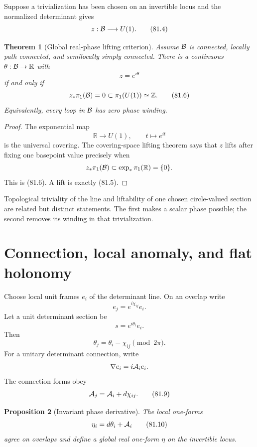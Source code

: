 \documentclass[11pt]{article}
\newtheorem{theorem}{Theorem}[section]
\newtheorem{proposition}[theorem]{Proposition}
\theoremstyle{remark}
\begin{document}
Suppose a trivialization has been chosen on an invertible locus
and the normalized determinant gives
\[
 z:{\cal B}\longrightarrow U(1).                      \tag{81.4}
\]

\begin{theorem}[Global real-phase lifting criterion]
\label{thm:v15v81-lift}
Assume \({\cal B}\) is connected, locally path connected, and
semilocally simply connected.  There is a continuous
\(\theta:{\cal B}\to{\mathbb R}\) with
\[
 z=e^{i\theta}                                        \tag{81.5}
\]
if and only if
\[
 z_*\pi_1({\cal B})=0\subset\pi_1(U(1))\simeq{\mathbb Z}.        \tag{81.6}
\]
Equivalently, every loop in \({\cal B}\) has zero phase winding.
\end{theorem}

\begin{proof}
The exponential map
\[
 {\mathbb R}\longrightarrow U(1),\qquad t\longmapsto e^{it}
\]
is the universal covering.  The covering-space lifting theorem
says that \(z\) lifts after fixing one basepoint value precisely
when
\[
 z_*\pi_1({\cal B})
 \subset
 \exp_*\pi_1({\mathbb R})=\{0\}.
\]
This is (81.6).  A lift is exactly (81.5).
\end{proof}

Topological triviality of the line and liftability of one chosen
circle-valued section are related but distinct statements.  The
first makes a scalar phase possible; the second removes its winding
in that trivialization.

\section{Connection, local anomaly, and flat holonomy}

Choose local unit frames \(e_i\) of the determinant line.  On an
overlap write
\[
 e_j=e^{i\chi_{ij}}e_i.                               \tag{81.7}
\]
Let a unit determinant section be
\[
 s=e^{i\theta_i}e_i.
\]
Then
\[
 \theta_j=\theta_i-\chi_{ij}\pmod{2\pi}.              \tag{81.8}
\]
For a unitary determinant connection, write
\[
 \nabla e_i=i{\cal A}_i e_i.
\]
The connection forms obey
\[
 {\cal A}_j={\cal A}_i+d\chi_{ij}.                    \tag{81.9}
\]

\begin{proposition}[Invariant phase derivative]
\label{prop:v15v81-covariant-phase}
The local one-forms
\[
 \eta_i=d\theta_i+{\cal A}_i                          \tag{81.10}
\]
agree on overlaps and define a global real one-form \(\eta\) on
the invertible locus.
\end{proposition}
\end{document}
